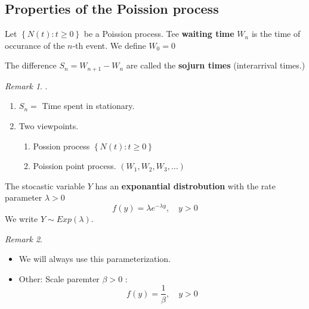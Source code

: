 \documentclass{article}
\theoremstyle{remark}
\newtheorem*{remark}{Remark}
\newcommand{\newpara}
  {
  \vskip 0.4cm
  }
\begin{document}
\subsection{Properties of the Poission process}%
\label{sub:properties_of_the_poission_process}

\begin{definition}
  Let $\left\{ N\left( t \right): t \ge 0 \right\}$ be a Poission process.  Tee \textbf{waiting time } $W_{n}$  is the time of occurance of the $n$-th event. We define $W_{0} = 0$
\end{definition}

\begin{definition}
  The difference $S_{n} = W_{n+1} - W_{n}$ are called the \textbf{sojurn times }  (interarrival times.)
\end{definition}

\begin{remark}.
 \newpara
  \begin{enumerate}[label=(\roman*)]
    \item $\displaystyle S_{n} = $ Time spent in stationary.
    \item Two viewpoints.
    \begin{enumerate}[label=(\alph*)]
      \item Possion process $\left\{ N\left( t \right):  t\ge 0  \right\}$
      \item Poission point process. $\left( W_{1}, W_{2}, W_{3}, \ldots \right)$
    \end{enumerate}
  \end{enumerate}
\end{remark}

\begin{definition}
  The stocastic variable $Y$ has an \textbf{exponantial distrobution }  with the rate parameter $\lambda  > 0$ \[
  f\left( y \right) = \lambda  e^{-\lambda  y} , \quad  y>0
  \]
  We write $Y \sim Exp \left( \lambda  \right)$.
\end{definition}



\begin{remark}
  \begin{itemize}
    \item
  We will always use this parameterization.
\item Other: Scale paremter $\beta > 0$ : \[
f\left( y \right) = \frac{1}{\beta } , \quad  y> 0
\]
  \end{itemize}

\end{remark}
\end{document}
